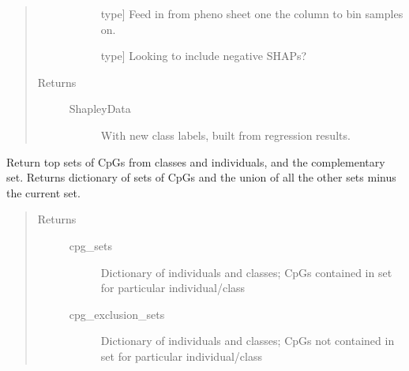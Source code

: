 \documentclass[letterpaper,10pt,english]{sphinxmanual}
\begin{document}
\begin{fulllineitems}
\begin{fulllineitems}
\begin{quote}
\begin{description}
\begin{description}
\item[{}] \leavevmode{[}type{]}
Feed in from pheno sheet one the column to bin samples on.

\item[{}] \leavevmode{[}type{]}
Looking to include negative SHAPs?

\end{description}

\item[{Returns}] \leavevmode\begin{description}
\item[{ShapleyData}] \leavevmode
With new class labels, built from regression results.

\end{description}

\end{description}\end{quote}

\end{fulllineitems}


\begin{fulllineitems}
\label{\detokenize{index:methylnet.interpretation_classes.ShapleyDataExplorer.return_cpg_sets}}
Return top sets of CpGs from classes and individuals, and the complementary set. Returns dictionary of sets of CpGs and the union of all the other sets minus the current set.
\begin{quote}\begin{description}
\item[{Returns}] \leavevmode\begin{description}
\item[{cpg\_sets}] \leavevmode
Dictionary of individuals and classes; CpGs contained in set for particular individual/class

\item[{cpg\_exclusion\_sets}] \leavevmode
Dictionary of individuals and classes; CpGs not contained in set for particular individual/class

\end{description}

\end{description}\end{quote}


\end{fulllineitems}
\end{fulllineitems}
\end{document}
